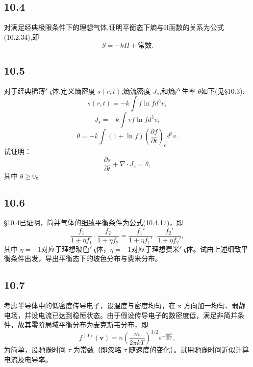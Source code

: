 \newpage
\subsection{10.4}
对满足经典极限条件下的理想气体,证明平衡态下熵与H函数的关系为公式(10.2.34),即
$$S = -k H + 常数.$$

\newpage
\subsection{10.5}
对于经典稀薄气体,定义熵密度 $s(r,t)$,熵流密度 $J_s$,和熵产生率 $\theta$如下(见§10.3):
$$s(r,t) = -k \int f \ln f d^3 v,$$
$$J_s = -k \int v f \ln f d^3 v,$$
$$\theta = -k \int (1+\ln f) \left( \frac{\partial f}{\partial t} \right)_c d^3 v.$$
试证明：
$$\frac{\partial s}{\partial t} + \nabla \cdot J_s = \theta,$$
其中 $\theta \geq 0$。

\newpage
\subsection{10.6}
§10.4已证明，简并气体的细致平衡条件为公式(10.4.17)，即
$$\frac{f_1}{1+\eta f_1} \cdot \frac{f_2}{1+\eta f_2} = \frac{f_1'}{1+\eta f_1'} \cdot \frac{f_2'}{1+\eta f_2'},$$
其中 $\eta = +1$对应于理想玻色气体，$\eta = -1$对应于理想费米气体。试由上述细致平衡条件出发，导出平衡态下的玻色分布与费米分布。

\newpage
\subsection{10.7}
考虑半导体中的低密度传导电子，设温度与密度均匀，在 x 方向加一均匀、弱静电场，并设电流已达到稳恒状态。由于假设传导电子的数密度低，满足非简并条件，故其零阶局域平衡分布为麦克斯韦分布，即
$$f^{(0)} (\mathbf{v}) = n \left( \frac{m}{2 \pi k T} \right)^{3/2} e^{-\frac{mv^2}{2kT}},$$
为简单，设驰豫时间 $\tau$ 为常数（即忽略 $\tau$ 随速度的变化）。试用驰豫时间近似计算电流及电导率。